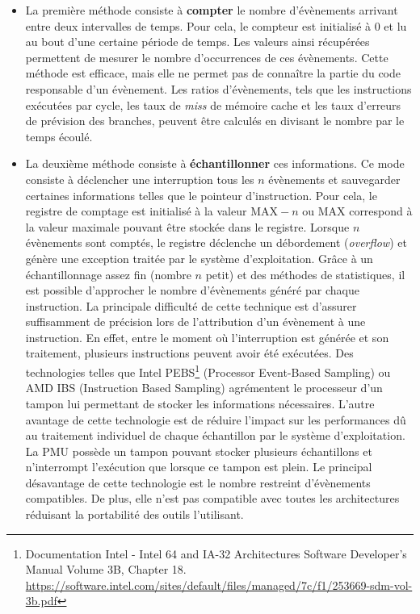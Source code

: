             \begin{itemize}
                \item La première méthode consiste à \textbf{compter} le nombre d'évènements arrivant entre deux intervalles de temps. Pour cela, le compteur est initialisé à $0$ et lu au bout d'une certaine période de temps. Les valeurs ainsi récupérées permettent de mesurer le nombre d'occurrences de ces évènements. Cette méthode est efficace, mais elle ne permet pas de connaître la partie du code responsable d'un évènement. Les ratios d'évènements, tels que les instructions exécutées par cycle, les taux de \textit{miss} de mémoire cache et les taux d'erreurs de prévision des branches, peuvent être calculés en divisant le nombre par le temps écoulé.
                
                \item La deuxième méthode consiste à \textbf{échantillonner} ces informations. Ce mode consiste à déclencher une interruption tous les $n$ évènements et sauvegarder certaines informations telles que le pointeur d'instruction. Pour cela, le registre de comptage est initialisé à la valeur $\text{MAX} - n$ ou $\text{MAX}$ correspond à la valeur maximale pouvant être stockée dans le registre. Lorsque $n$ évènements sont comptés, le registre déclenche un débordement (\textit{overflow}) et génère une exception traitée par le système d'exploitation. Grâce à un échantillonnage assez fin (nombre $n$ petit) et des méthodes de statistiques, il est possible d'approcher le nombre d'évènements généré par chaque instruction. La principale difficulté de cette technique est d'assurer suffisamment de précision lors de l'attribution d'un évènement à une instruction. En effet, entre le moment où l'interruption est générée et son traitement, plusieurs instructions peuvent avoir été exécutées. Des technologies telles que Intel PEBS\footnote{Documentation Intel - Intel 64 and IA-32 Architectures Software Developer's Manual Volume 3B, Chapter 18. \url{https://software.intel.com/sites/default/files/managed/7c/f1/253669-sdm-vol-3b.pdf}} (Processor Event-Based Sampling) ou AMD IBS (Instruction Based Sampling) \cite{Drongowski2007} agrémentent le processeur d'un tampon lui permettant de stocker les informations nécessaires. L'autre avantage de cette technologie est de réduire l'impact sur les performances dû au traitement individuel de chaque échantillon par le système d'exploitation. La PMU possède un tampon pouvant stocker plusieurs échantillons et n'interrompt l'exécution que lorsque ce tampon est plein. Le principal désavantage de cette technologie est le nombre restreint d'évènements compatibles. De plus, elle n'est pas compatible avec toutes les architectures réduisant la portabilité des outils l'utilisant.
            \end{itemize}
                
